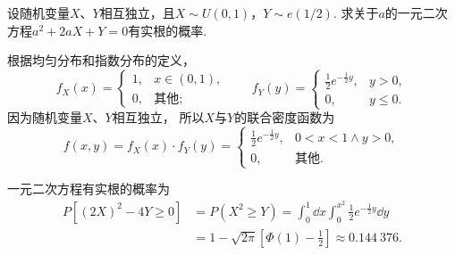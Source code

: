 \begin{example}
设随机变量\(X\)、\(Y\)相互独立，且\(X \sim U(0,1)\)，\(Y \sim e(1/2)\).
求关于\(a\)的一元二次方程\(a^2 + 2aX + Y = 0\)有实根的概率.
\begin{solution}
根据均匀分布和指数分布的定义，\begin{equation*}
	f_X(x) = \left\{ \begin{array}{cl}
		1, & x\in(0,1), \\
		0, & \text{其他};
	\end{array} \right.
	\qquad
	f_Y(y) = \left\{ \begin{array}{cl}
		\frac{1}{2} e^{-\frac{1}{2} y}, & y>0, \\
		0, & y \leq 0.
	\end{array} \right.
\end{equation*}
因为随机变量\(X\)、\(Y\)相互独立，
所以\(X\)与\(Y\)的联合密度函数为\begin{equation*}
	f(x,y) = f_X(x) \cdot f_Y(y)
	= \left\{ \begin{array}{cl}
		\frac{1}{2} e^{-\frac{1}{2} y}, & 0<x<1 \land y>0, \\
		0, & \text{其他}.
	\end{array} \right.
\end{equation*}

一元二次方程有实根的概率为\begin{align*}
	P[(2X)^2 - 4Y \geq 0]
	&= P(X^2 \geq Y)
	= \int_0^1 \dd{x} \int_0^{x^2} \frac{1}{2} e^{-\frac{1}{2} y} \dd{y} \\
	&= 1 - \sqrt{2\pi} \left[ \Phi(1) - \frac{1}{2} \right]
	\approx 0.144~376.
\end{align*}
\end{solution}
\end{example}

